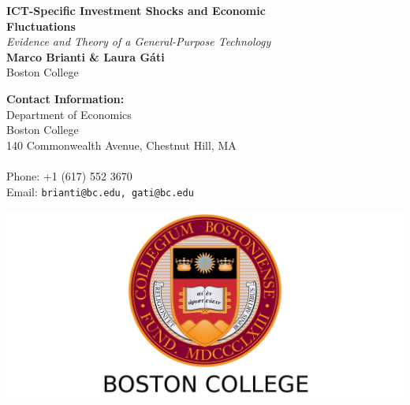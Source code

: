 \documentclass[a0,landscape]{a0poster}
\begin{document}


\begin{minipage}[b]{0.55\linewidth}
\veryHuge \color{NavyBlue} \textbf{ICT-Specific Investment Shocks and Economic  \\ Fluctuations} \color{Black}\\ %
\Huge\textit{Evidence and Theory of a General-Purpose Technology}\\[1cm] %
\huge \textbf{Marco Brianti \& Laura G\'ati}\\ %
\huge Boston College\\ %
\end{minipage}
%
\begin{minipage}[b]{0.25\linewidth}
\color{DarkSlateGray}\Large \textbf{Contact Information:}\\
Department of Economics\\ %
Boston College\\
140 Commonwealth Avenue, Chestnut Hill, MA \\\\
Phone: +1 (617) 552 3670\\ %
Email: \texttt{brianti@bc.edu, gati@bc.edu}\\ %
\end{minipage}
%
\begin{minipage}[b]{0.19\linewidth}
\includegraphics[width=25cm]{logo.jpg} %
\end{minipage}
\end{document}
